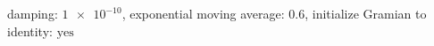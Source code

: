 damping: $\num[scientific-notation=true]{1e-10}$, exponential moving average: $\num[scientific-notation=true]{0.6}$, initialize Gramian to identity: $\text{yes}$